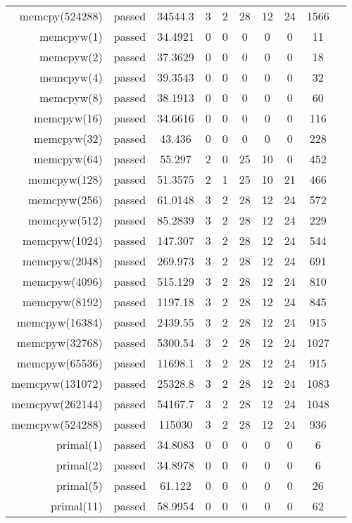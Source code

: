 \begin{longtable}{r|ccccccccc}
    memcpy(524288) & passed & 34544.3 & 3 & 2 & 28 & 12 & 24 & 1566 \\
    memcpyw(1) & passed & 34.4921 & 0 & 0 & 0 & 0 & 0 & 11 \\
    memcpyw(2) & passed & 37.3629 & 0 & 0 & 0 & 0 & 0 & 18 \\
    memcpyw(4) & passed & 39.3543 & 0 & 0 & 0 & 0 & 0 & 32 \\
    memcpyw(8) & passed & 38.1913 & 0 & 0 & 0 & 0 & 0 & 60 \\
    memcpyw(16) & passed & 34.6616 & 0 & 0 & 0 & 0 & 0 & 116 \\
    memcpyw(32) & passed & 43.436 & 0 & 0 & 0 & 0 & 0 & 228 \\
    memcpyw(64) & passed & 55.297 & 2 & 0 & 25 & 10 & 0 & 452 \\
    memcpyw(128) & passed & 51.3575 & 2 & 1 & 25 & 10 & 21 & 466 \\
    memcpyw(256) & passed & 61.0148 & 3 & 2 & 28 & 12 & 24 & 572 \\
    memcpyw(512) & passed & 85.2839 & 3 & 2 & 28 & 12 & 24 & 229 \\
    memcpyw(1024) & passed & 147.307 & 3 & 2 & 28 & 12 & 24 & 544 \\
    memcpyw(2048) & passed & 269.973 & 3 & 2 & 28 & 12 & 24 & 691 \\
    memcpyw(4096) & passed & 515.129 & 3 & 2 & 28 & 12 & 24 & 810 \\
    memcpyw(8192) & passed & 1197.18 & 3 & 2 & 28 & 12 & 24 & 845 \\
    memcpyw(16384) & passed & 2439.55 & 3 & 2 & 28 & 12 & 24 & 915 \\
    memcpyw(32768) & passed & 5300.54 & 3 & 2 & 28 & 12 & 24 & 1027 \\
    memcpyw(65536) & passed & 11698.1 & 3 & 2 & 28 & 12 & 24 & 915 \\
    memcpyw(131072) & passed & 25328.8 & 3 & 2 & 28 & 12 & 24 & 1083 \\
    memcpyw(262144) & passed & 54167.7 & 3 & 2 & 28 & 12 & 24 & 1048 \\
    memcpyw(524288) & passed & 115030 & 3 & 2 & 28 & 12 & 24 & 936 \\
    primal(1) & passed & 34.8083 & 0 & 0 & 0 & 0 & 0 & 6 \\
    primal(2) & passed & 34.8978 & 0 & 0 & 0 & 0 & 0 & 6 \\
    primal(5) & passed & 61.122 & 0 & 0 & 0 & 0 & 0 & 26 \\
    primal(11) & passed & 58.9954 & 0 & 0 & 0 & 0 & 0 & 62 \\

\end{longtable}
